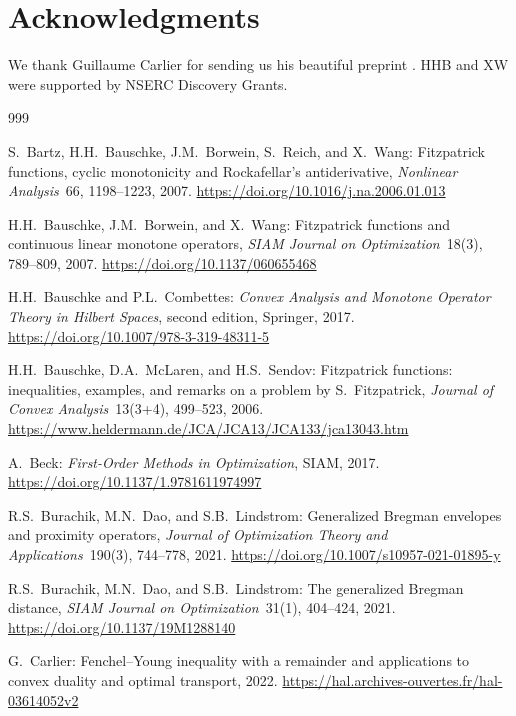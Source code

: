 \documentclass[12pt]{article}
\theoremstyle{definition}
\begin{document}
{\section*{Acknowledgments}
We thank Guillaume Carlier for sending us his beautiful preprint \cite{Carlier}. 
HHB and XW were supported by NSERC Discovery Grants. 


\begin{thebibliography}{999}


S.\ Bartz, H.H.\ Bauschke, J.M.\ Borwein, S.\ Reich, and X.\ Wang: 
Fitzpatrick functions, cyclic monotonicity and Rockafellar's antiderivative, \emph{Nonlinear Analysis}~66, 1198--1223, 2007. 
\url{https://doi.org/10.1016/j.na.2006.01.013}

H.H.\ Bauschke, J.M.\ Borwein, and X.\ Wang: 
Fitzpatrick functions and continuous linear monotone operators, 
\emph{SIAM Journal on Optimization}~18(3), 789--809, 2007.
\url{https://doi.org/10.1137/060655468}

H.H.\ Bauschke and P.L.\ Combettes:
\emph{Convex Analysis and Monotone Operator Theory in Hilbert Spaces},
second edition,
Springer, 2017. 
\url{https://doi.org/10.1007/978-3-319-48311-5}


H.H.\ Bauschke, D.A.\ McLaren, and H.S.\ Sendov: 
Fitzpatrick functions: inequalities, examples, and remarks 
on a problem by S.~Fitzpatrick, 
\emph{Journal of Convex Analysis}~13(3+4), 499--523, 2006.
\url{https://www.heldermann.de/JCA/JCA13/JCA133/jca13043.htm}


A.\ Beck:
\emph{First-Order Methods in Optimization}, 
SIAM, 2017. 
\url{https://doi.org/10.1137/1.9781611974997}

R.S.\ Burachik, M.N.\ Dao, and S.B.\ Lindstrom:
Generalized Bregman envelopes and proximity operators,
\emph{Journal of Optimization Theory and Applications}~190(3), 
744--778, 2021. 
\url{https://doi.org/10.1007/s10957-021-01895-y}

R.S.\ Burachik, M.N.\ Dao, and S.B.\ Lindstrom:
The generalized Bregman distance, 
\emph{SIAM Journal on Optimization}~31(1), 404--424, 2021. 
\url{https://doi.org/10.1137/19M1288140}

G.\ Carlier:
Fenchel--Young inequality with a remainder and 
applications to convex duality and optimal transport,
2022.
\url{https://hal.archives-ouvertes.fr/hal-03614052v2}


\end{thebibliography}}
\end{document}
